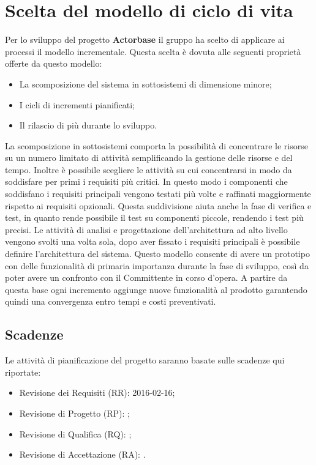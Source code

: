 \documentclass{scalatekids-article}
\begin{document}
\section{Scelta del modello di ciclo di vita}
Per lo sviluppo del progetto \textbf{Actorbase} il gruppo ha scelto di applicare
ai processi il modello incrementale. Questa scelta è dovuta alle seguenti
proprietà offerte da questo modello:
\begin{itemize}
\item {La scomposizione del sistema in sottosistemi di dimensione minore;}
\item {I cicli di incrementi pianificati;}
\item {Il rilascio di più  durante lo sviluppo.}
\end{itemize}
La scomposizione in sottosistemi comporta la possibilità di concentrare le
risorse su un numero limitato di attività semplificando la gestione delle
risorse e del tempo. Inoltre è possibile scegliere le attività su cui
concentrarsi in modo da soddisfare per primi i requisiti più critici. In questo
modo i componenti che soddisfano i requisiti principali vengono testati più
volte e raffinati maggiormente rispetto ai requisiti opzionali. Questa
suddivisione aiuta anche la fase di verifica e test, in quanto rende possibile
il test su componenti piccole, rendendo i test più precisi. Le attività di
analisi e progettazione dell'architettura ad alto livello vengono svolti una
volta sola, dopo aver fissato i requisiti principali è possibile definire
l'architettura del sistema. Questo modello consente di avere un prototipo con
delle funzionalità di primaria importanza durante la fase di sviluppo, così da
poter avere un confronto con il Committente in corso d'opera. A partire da
questa base ogni incremento aggiunge nuove funzionalità al prodotto garantendo
quindi una convergenza entro tempi e costi preventivati.
\subsection{Scadenze}
Le attività di pianificazione del progetto saranno basate sulle scadenze qui riportate:
\begin{itemize}
\item {Revisione dei Requisiti (RR): 2016-02-16;}
\item {Revisione di Progetto (RP): ;}
\item {Revisione di Qualifica (RQ): ;}
\item {Revisione di Accettazione (RA): .}
\end{itemize}
\end{document}
